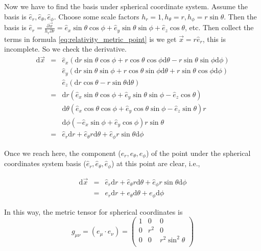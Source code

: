 Now we have to find the basis under spherical coordinate system. Assume the basis is $\hat e_r, \hat e_\theta, \hat e_\phi$. Choose some scale factors $h_r=1, h_\theta=r, h_\phi=r\sin\theta$. Then the basis is
$\hat e_r=\frac{\partial \vec x}{h_r\partial r}=\hat e_x \sin\theta\cos\phi+\hat e_y \sin\theta\sin\phi+\hat e_z \cos\theta$, etc. Then collect the terms in formula \ref{eq:relativity_metric_point} is we get $\vec x=r\hat e_r$, this is incomplete. So we check the derivative.
\begin{eqnarray}
\mathrm d\vec x&=& \hat e_x (\mathrm dr \sin\theta\cos\phi+r\cos\theta\cos\phi\mathrm d\theta-r\sin\theta\sin\phi\mathrm d\phi)\\
&&\hat e_y (\mathrm dr\sin\theta\sin\phi+r\cos\theta\sin\phi\mathrm d\theta+r\sin\theta\cos\phi\mathrm d\phi) \\
&&\hat e_z (\mathrm dr\cos\theta-r\sin\theta\mathrm d\theta) \\
&=&\mathrm dr(\hat e_x\sin\theta\cos\phi +\hat e_y \sin\theta\sin\phi -\hat e_z \cos\theta)  \\
&&\mathrm d\theta (\hat e_x\cos\theta\cos\phi +\hat e_y \cos\theta\sin\phi - \hat e_z \sin\theta)r \\
&&\mathrm d\phi (-\hat e_x\sin\phi +\hat e_y \cos\phi)r\sin\theta  \\
&=&\hat e_r\mathrm dr+\hat e_\theta r\mathrm d\theta +\hat e_\phi r\sin\theta\mathrm d \phi
\end{eqnarray}

Once we reach here, the component ($e_r ,e_\theta, e_\phi$) of the point under the spherical coordinates system basis ($\hat e_r, \hat e_\theta, \hat e_\phi$) at this point are clear, i.e.,

\begin{eqnarray}
\mathrm d\vec x&=&\hat e_r\mathrm d r+\hat e_\theta r\mathrm d \theta+\hat e_\phi r\sin\theta \mathrm d\phi \\
&=&e_r\mathrm d r+e_\theta \mathrm d\theta+e_\phi \mathrm d\phi
\end{eqnarray}

In this way, the metric tensor for spherical coordinates is 
\begin{equation}
g_{\mu\nu}=(e_\mu\cdot e_\nu)=\left(\begin{matrix}
1 &0&0 \\
0& r^2&0 \\
0&0& r^2\sin^2\theta \\
\end{matrix}\right)
\end{equation}




